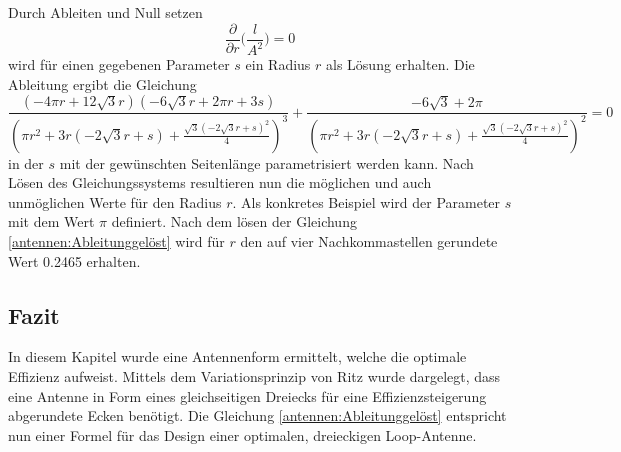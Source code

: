 Durch Ableiten und Null setzen
\begin{equation}
	\frac{\partial}{\partial{r}} \bigg(\frac{l}{A^2}\bigg)=0
	\label{antennen:Ableitung}
\end{equation}
wird für einen gegebenen Parameter $s$ ein Radius $r$ als Lösung erhalten. 
Die Ableitung ergibt die Gleichung 
\begin{equation}
	\frac{\left(- 4 \pi r + 12 \sqrt{3} r\right) \left(- 6 \sqrt{3} r + 2 \pi r + 3 s\right)}{\left(\pi r^{2} + 3 r \left(- 2 \sqrt{3} r + s\right) + \frac{\sqrt{3} \left(- 2 \sqrt{3} r + s\right)^{2}}{4}\right)^{3}} + \frac{- 6 \sqrt{3} + 2 \pi}{\left(\pi r^{2} + 3 r \left(- 2 \sqrt{3} r + s\right) + \frac{\sqrt{3} \left(- 2 \sqrt{3} r + s\right)^{2}}{4}\right)^{2}}=0
	\label{antennen:Ableitunggelöst}
\end{equation}
in der $s$ mit der gewünschten Seitenlänge parametrisiert werden kann. Nach Lösen des Gleichungssystems resultieren nun die möglichen und auch unmöglichen Werte für den Radius $r$. Als konkretes Beispiel wird der Parameter $s$ mit dem Wert $\pi$ definiert. Nach dem lösen der Gleichung \eqref{antennen:Ableitunggelöst} wird für $r$ den auf vier Nachkommastellen gerundete Wert 0.2465 erhalten.
\subsection{Fazit\label{antennen:fazit}}
In diesem Kapitel wurde eine Antennenform ermittelt, welche die optimale Effizienz aufweist. Mittels dem Variationsprinzip von Ritz wurde dargelegt, dass eine Antenne in Form eines gleichseitigen Dreiecks für eine Effizienzsteigerung abgerundete Ecken benötigt. Die Gleichung \eqref{antennen:Ableitunggelöst} entspricht nun einer Formel für das Design einer optimalen, dreieckigen Loop-Antenne. 
